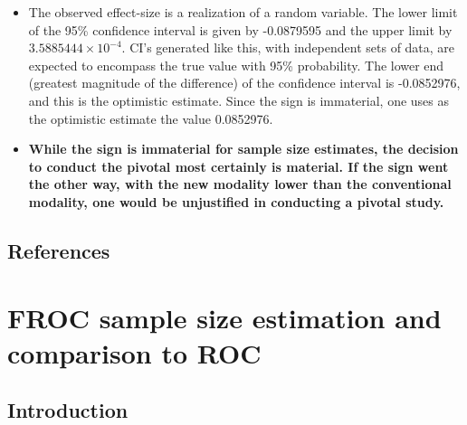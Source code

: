 \documentclass[]{book}
\begin{document}
\begin{itemize}
\item
  The observed effect-size is a realization of a random variable. The lower limit of the 95\% confidence interval is given by -0.0879595 and the upper limit by \ensuremath{3.5885444\times 10^{-4}}. CI's generated like this, with independent sets of data, are expected to encompass the true value with 95\% probability. The lower end (greatest magnitude of the difference) of the confidence interval is -0.0852976, and this is the optimistic estimate. Since the sign is immaterial, one uses as the optimistic estimate the value 0.0852976.
\item
  \textbf{While the sign is immaterial for sample size estimates, the decision to conduct the pivotal most certainly is material. If the sign went the other way, with the new modality lower than the conventional modality, one would be unjustified in conducting a pivotal study.}
\end{itemize}

\hypertarget{references-8}{%
\section{References}\label{references-8}}

\hypertarget{SSFroc1}{%
\chapter{FROC sample size estimation and comparison to ROC}\label{SSFroc1}}

\hypertarget{introduction-11}{%
\section{Introduction}\label{introduction-11}}
\end{document}
